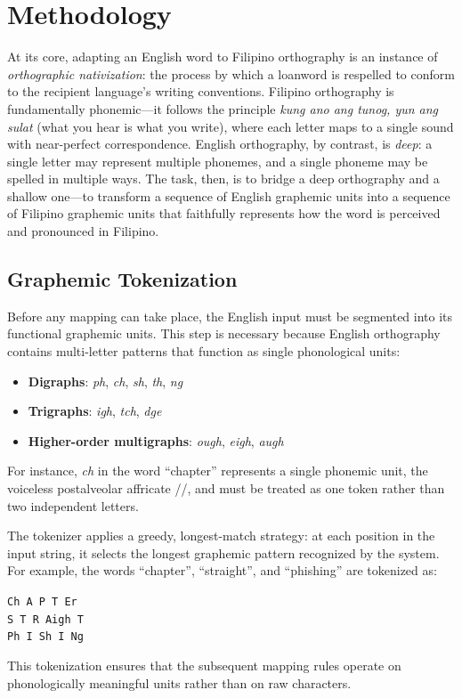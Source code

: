 \section{Methodology}

At its core, adapting an English word to Filipino orthography is an instance of
\emph{orthographic nativization}: the process by which a loanword is respelled
to conform to the recipient language's writing conventions.
Filipino orthography is fundamentally phonemic---it follows the principle
\emph{kung ano ang tunog, yun ang sulat} (what you hear is what you write),
where each letter maps to a single sound with near-perfect
correspondence. English orthography, by contrast, is
\emph{deep}: a single letter may represent multiple phonemes, and a single
phoneme may be spelled in multiple ways. The task, then, is to bridge a deep
orthography and a shallow one---to transform a sequence of English
graphemic units into a sequence of Filipino graphemic units that faithfully
represents how the word is perceived and pronounced in Filipino.

\subsection{Graphemic Tokenization}

Before any mapping can take place, the English input must be segmented into
its functional graphemic units. This step is necessary because English
orthography contains multi-letter patterns that function as single phonological units:
\begin{itemize}
    \item \textbf{Digraphs}: \emph{ph}, \emph{ch}, \emph{sh}, \emph{th}, \emph{ng}
    \item \textbf{Trigraphs}: \emph{igh}, \emph{tch}, \emph{dge}
    \item \textbf{Higher-order multigraphs}: \emph{ough}, \emph{eigh}, \emph{augh}
\end{itemize}
For instance, \emph{ch} in the word ``chapter'' represents a single phonemic
unit, the voiceless postalveolar affricate //, and must be treated
as one token rather than two independent letters.

The tokenizer applies a greedy, longest-match strategy: at each position in the
input string, it selects the longest graphemic pattern recognized by the system.
For example, the words ``chapter'', ``straight'', and ``phishing'' are tokenized
as:
\begin{center}
    \texttt{Ch~A~P~T~Er} \\
    \texttt{S~T~R~Aigh~T} \\
    \texttt{Ph~I~Sh~I~Ng}
\end{center}
This tokenization ensures that the subsequent mapping rules operate on
phonologically meaningful units rather than on raw characters.

